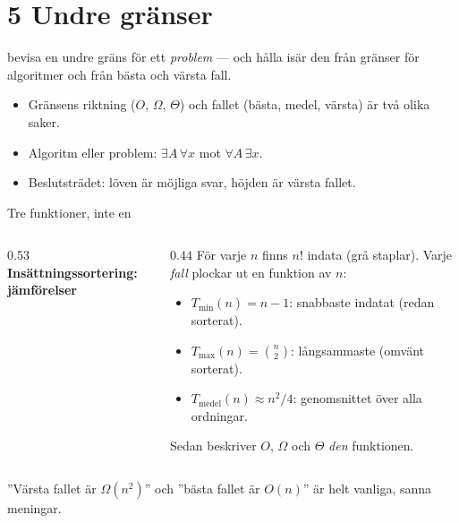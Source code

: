 \section{5 Undre gränser}

{bevisa en undre gräns för ett \emph{problem} — och hålla isär den från gränser för algoritmer
och från bästa och värsta fall.}
{\begin{itemize}\setlength{\itemsep}{1pt}
  \item Gränsens riktning ($O$, $\Omega$, $\Theta$) och fallet (bästa, medel, värsta) är två
        olika saker.
  \item Algoritm eller problem: $\exists A\,\forall x$ mot $\forall A\,\exists x$.
  \item Beslutsträdet: löven är möjliga svar, höjden är värsta fallet.
\end{itemize}}



\begin{frame}{Tre funktioner, inte en}
\begin{columns}[T]
\begin{column}{0.53\textwidth}
\centering
{\footnotesize\bfseries\color{kthnavy}Insättningssortering: jämförelser}\par\smallskip

\end{column}
\begin{column}{0.44\textwidth}
\footnotesize
För varje $n$ finns $n!$ indata (grå staplar). Varje \emph{fall} plockar ut en funktion av $n$:
\begin{itemize}\setlength{\itemsep}{2pt}
  \item $T_{\min}(n)=n-1$: snabbaste indatat (redan sorterat).
  \item $T_{\max}(n)=\binom n2$: långsammaste (omvänt sorterat).
  \item $T_{\mathrm{medel}}(n)\approx n^2/4$: genomsnittet över alla ordningar.
\end{itemize}
Sedan beskriver $O$, $\Omega$ och $\Theta$ \emph{den} funktionen.
\end{column}
\end{columns}
\vfill
\begin{ahabox}
”Värsta fallet är $\Omega(n^2)$” och ”bästa fallet är $O(n)$” är helt vanliga, sanna meningar.
\end{ahabox}
\end{frame}

